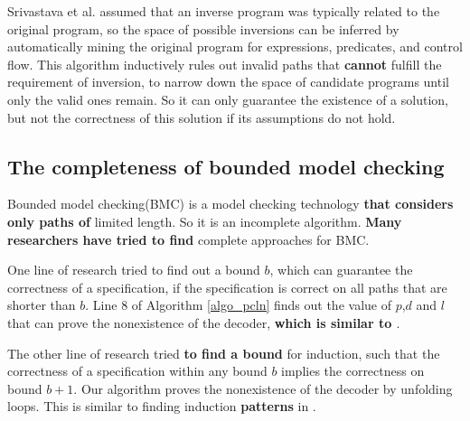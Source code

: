 \documentclass[journal]{IEEEtran}
\begin{document}
{Srivastava et al. \cite{prog_inv_rev} assumed that an inverse program was typically related to the original program,
so the space of possible inversions can be inferred by automatically
mining the original program for expressions, predicates, and control flow.
This algorithm inductively rules out invalid paths that \textbf{cannot} fulfill the requirement of inversion,
to narrow down the space of candidate programs until only the valid ones remain.
So it can only guarantee the existence of a solution,
but not the correctness of this solution if its assumptions do not hold.

\subsection{The completeness of bounded model checking}\label{subsec_bmc_relate}
Bounded model checking(BMC) \cite{bmc_tacas99} is a model checking technology \textbf{that considers only paths of} limited length.
So it is an incomplete algorithm.
\textbf{Many researchers have tried to find} complete approaches for BMC.

One line of research\cite{bmc_tacas99,RecDiam} tried to find out a bound $b$,
which can guarantee the correctness of a specification,
if the specification is correct on all paths that are shorter than $b$.
Line 8 of Algorithm \ref{algo_pcln} finds out the value of $p$,$d$ and $l$ that can prove the nonexistence of the decoder,
\textbf{which is similar to \cite{bmc_tacas99,RecDiam}}.

The other line of research\cite{kind_tacas99} tried \textbf{to find a bound} for induction,
such that the correctness of a specification within any bound $b$ implies the correctness on bound $b+1$.
Our algorithm proves the nonexistence of the decoder by unfolding loops.
This is similar to finding induction \textbf{patterns} in \textbf{\cite{kind_tacas99}}.


}
\end{document}
